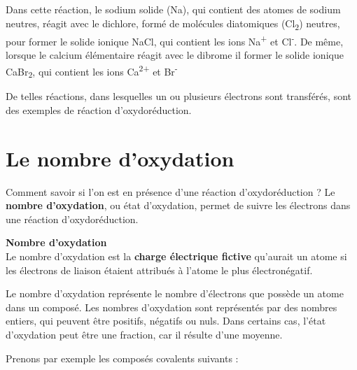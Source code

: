 \documentclass[
  11pt,
  a4paper,
  openany]{book}
\begin{document}
Dans cette réaction, le sodium solide (Na), qui contient des atomes de sodium neutres, réagit avec le dichlore, formé de molécules diatomiques (Cl\textsubscript{2}) neutres, pour former le solide ionique NaCl, qui contient les ions Na\textsuperscript{+} et Cl\textsuperscript{-}. De même, lorsque le calcium élémentaire réagit avec le dibrome il former le solide ionique CaBr\textsubscript{2}, qui contient les ions Ca\textsuperscript{2+} et Br\textsuperscript{-}

De telles réactions, dans lesquelles un ou plusieurs électrons sont transférés, sont des exemples de réaction d'oxydoréduction.

\clearpage

\section{Le nombre d'oxydation}\label{le-nombre-doxydation}

Comment savoir si l'on est en présence d'une réaction d'oxydoréduction ? Le \textbf{nombre d'oxydation}, ou état d'oxydation, permet de suivre les électrons dans une réaction d'oxydoréduction.

\begin{tcolorbox}
\textbf{Nombre d'oxydation}\\
Le nombre d'oxydation est la \textbf{charge électrique fictive} qu'aurait un atome si les électrons de liaison étaient attribués à l'atome le plus électronégatif.


\end{tcolorbox}

Le nombre d'oxydation représente le nombre d'électrons que possède un atome dans un composé. Les nombres d'oxydation sont représentés par des nombres entiers, qui peuvent être positifs, négatifs ou nuls. Dans certains cas, l'état d'oxydation peut être une fraction, car il résulte d'une moyenne.

Prenons par exemple les composés covalents suivants :
\end{document}
